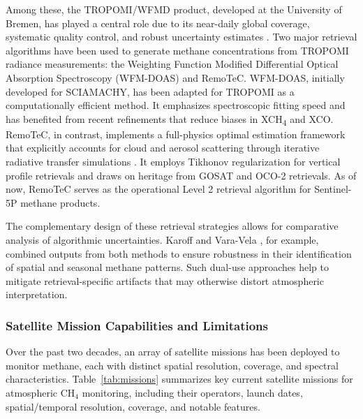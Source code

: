 Among these, the TROPOMI/WFMD product, developed at the University of Bremen, has played a central role due to its near-daily global coverage, systematic quality control, and robust uncertainty estimates \cite{Schneising2019}. Two major retrieval algorithms have been used to generate methane concentrations from TROPOMI radiance measurements: the Weighting Function Modified Differential Optical Absorption Spectroscopy (WFM-DOAS) and RemoTeC. WFM-DOAS, initially developed for SCIAMACHY, has been adapted for TROPOMI as a computationally efficient method. It emphasizes spectroscopic fitting speed and has benefited from recent refinements that reduce biases in XCH\textsubscript{4} and XCO. RemoTeC, in contrast, implements a full-physics optimal estimation framework that explicitly accounts for cloud and aerosol scattering through iterative radiative transfer simulations \cite{evaluation}. It employs Tikhonov regularization for vertical profile retrievals and draws on heritage from GOSAT and OCO-2 retrievals. As of now, RemoTeC serves as the operational Level 2 retrieval algorithm for Sentinel-5P methane products.

The complementary design of these retrieval strategies allows for comparative analysis of algorithmic uncertainties. Karoff and Vara-Vela \cite{Karoff2023}, for example, combined outputs from both methods to ensure robustness in their identification of spatial and seasonal methane patterns. Such dual-use approaches help to mitigate retrieval-specific artifacts that may otherwise distort atmospheric interpretation.

\subsubsection{Satellite Mission Capabilities and Limitations}

Over the past two decades, an array of satellite missions has been deployed to monitor methane, each with distinct spatial resolution, coverage, and spectral characteristics. Table~\ref{tab:missions} summarizes key current satellite missions for atmospheric CH$_4$ monitoring, including their operators, launch dates, spatial/temporal resolution, coverage, and notable features.

